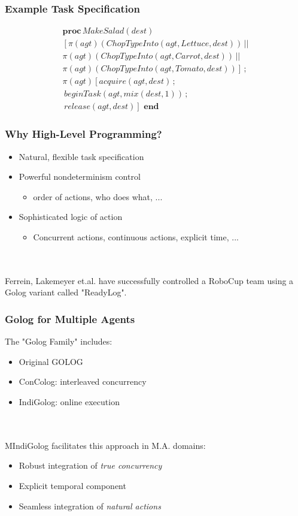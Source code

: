 \documentclass[compress]{beamer}
\begin{document}
\begin{frame}
\frametitle{Example Task Specification}
\begin{multline*}
\mathbf{proc}\, MakeSalad(dest)\\
\left[\pi(agt)(ChopTypeInto(agt,Lettuce,dest))\,||\right.\\
\pi(agt)(ChopTypeInto(agt,Carrot,dest))\,||\\
\left.\pi(agt)(ChopTypeInto(agt,Tomato,dest))\right]\,;\\
\pi(agt)\left[acquire(agt,dest)\,;\right.\\
\,beginTask(agt,mix(dest,1))\,;\\
\left.\, release(agt,dest)\right]\,\,\mathbf{end}
\end{multline*}
\end{frame}

\begin{frame}
\frametitle{Why High-Level Programming?}
\begin{itemize}
\item Natural, flexible task specification
\item Powerful nondeterminism control
  \begin{itemize}
  \item order of actions, who does what, ...
  \end{itemize}
\item Sophisticated logic of action
  \begin{itemize}
  \item Concurrent actions, continuous actions, explicit time, ...
  \end{itemize}
\end{itemize}
\ \\
\ \\
Ferrein, Lakemeyer et.al. have successfully controlled a RoboCup team using
a Golog variant called "ReadyLog".
\end{frame}

\begin{frame}
\frametitle{Golog for Multiple Agents}
The "Golog Family" includes:
\begin{itemize}
  \item Original GOLOG
  \item ConColog: interleaved concurrency
  \item IndiGolog: online execution
\end{itemize}
\ \\
\ \\
MIndiGolog facilitates this approach in M.A. domains:
\begin{itemize}
\item Robust integration of \emph{true concurrency}
\item Explicit temporal component
\item Seamless integration of \emph{natural actions}
\end{itemize}
\end{frame}
\end{document}
